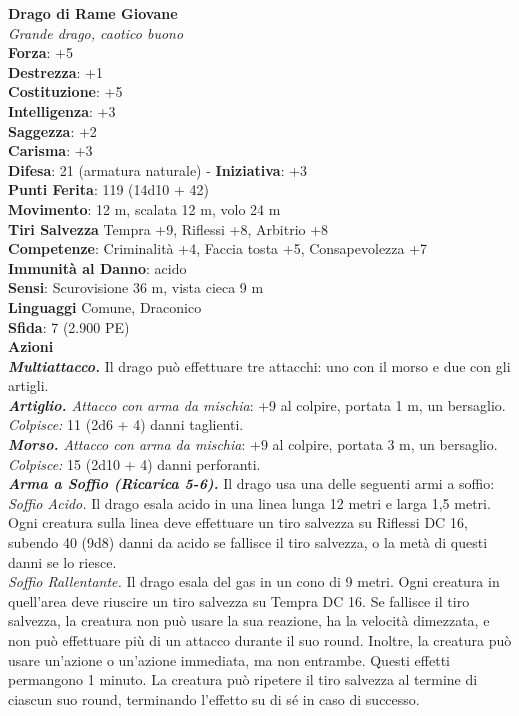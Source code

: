 \begin{multicols}{2}
\medskip\textbf{Drago di Rame Giovane}\\
\emph{Grande drago, caotico buono}\\
\textbf{Forza}: +5\\
\textbf{Destrezza}: +1\\
\textbf{Costituzione}: +5\\
\textbf{Intelligenza}: +3\\
\textbf{Saggezza}: +2\\
\textbf{Carisma}: +3\\
\textbf{Difesa}: 21 (armatura naturale) - \textbf{Iniziativa}: +3\\
\textbf{Punti Ferita}: 119 (14d10 + 42)\\
\textbf{Movimento}: 12 m, scalata 12 m, volo 24 m\\
\textbf{Tiri Salvezza} Tempra +9, Riflessi +8, Arbitrio +8\\
\textbf{Competenze}: Criminalità +4, Faccia tosta +5, Consapevolezza +7\\
\textbf{Immunità al Danno}: acido\\
\textbf{Sensi}: Scurovisione 36 m, vista cieca 9 m\\
\textbf{Linguaggi} Comune, Draconico\\
\textbf{Sfida}: 7 (2.900 PE)\smallskip\\
\smallskip\textbf{Azioni}\\
\emph{\textbf{Multiattacco.}} Il drago può effettuare tre attacchi: uno con il morso e due con gli artigli.\\
\emph{\textbf{Artiglio.} Attacco con arma da mischia}: +9 al colpire, portata 1 m, un bersaglio.\\
\emph{Colpisce:} 11 (2d6 + 4) danni taglienti.\\
\emph{\textbf{Morso.} Attacco con arma da mischia}: +9 al colpire, portata 3 m, un bersaglio.\\
\emph{Colpisce:} 15 (2d10 + 4) danni perforanti.\\
\emph{\textbf{Arma a Soffio (Ricarica 5-6).}} Il drago usa una delle seguenti armi a soffio:\\
\emph{Soffio Acido.} Il drago esala acido in una linea lunga 12 metri e larga 1,5 metri. Ogni creatura sulla linea deve effettuare un tiro salvezza su Riflessi DC  16, subendo 40 (9d8) danni da acido se fallisce il tiro salvezza, o la metà di questi danni se lo riesce.\\
\emph{Soffio Rallentante.} Il drago esala del gas in un cono di 9 metri. Ogni creatura in quell'area deve riuscire un tiro salvezza su Tempra DC  16. Se fallisce il tiro salvezza, la creatura non può usare la sua reazione, ha la velocità dimezzata, e non può effettuare più di un attacco durante il suo round. Inoltre, la creatura può usare un'azione o un'azione immediata, ma non entrambe. Questi effetti permangono 1 minuto. La creatura può ripetere il tiro salvezza al termine di ciascun suo round, terminando l'effetto su di sé in caso di successo.\\

\end{multicols}
